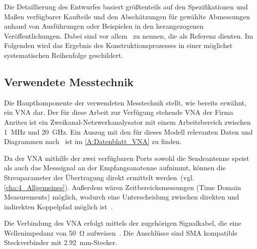
Die Detaillierung des Entwurfes basiert größtenteils auf den Spezifikationen und Maßen verfügbarer Kaufteile und den Abschätzungen für gewählte Abmessungen anhand von Ausführungen oder Beispielen in den herangezogenen Veröffentlichungen. Dabei sind vor allem~\cite{Design_of_shielded_enclosures, EMV-gerechtes_Geraetedesign, EM_Schirmung, Simplified_shielding, Handbook_Shielding_Materials_and_Performance} zu nennen, die als Referenz dienten. Im Folgenden wird das Ergebnis des Konstruktionsprozesses in einer möglichst systematischen Reihenfolge geschildert.

\subsection{Verwendete Messtechnik}

Die Hauptkomponente der verwendeten Messtechnik stellt, wie bereits erwähnt, ein \ac{VNA} dar. Der für diese Arbeit zur Verfügung stehende \ac{VNA} der Firma Anritsu ist ein Zweikanal-Netzwerkanalysator mit einem Arbeitsbereich zwischen \SI{1}{\mega\hertz} und \SI{20}{\giga\hertz}. Ein Auszug mit den für dieses Modell relevanten Daten und Diagrammen nach~\cite{VNA-Datenblatt} ist im \Anhang\ref{A:Datenblatt_VNA} zu finden. 
\par
\vspace{\linespace}
Da der \ac{VNA} mithilfe der zwei verfügbaren Ports sowohl die Sendeantenne speist als auch das Messsignal an der Empfangsanatenne aufnimmt, können die Streuparameter der Übertragung direkt ermittelt werden~(vgl. \Abschnitt\ref{cha:4_Allgemeines}). Außerdem wären Zeitbereichsmessungen (Time Domain Measurements) möglich, wodurch eine Unterscheidung zwischen direkten und indirekten Koppelpfad möglich ist~\cite{Techniques_Shielding_Effectiveness_Far_Field_Simulation}. %
\par
\vspace{\linespace}
Die Verbindung des \ac{VNA} erfolgt mittels der zugehörigen Signalkabel, die eine Wellenimpedanz von \SI{50}{\ohm} aufweisen~\cite{Testkabel_VNA-Datenblatt}. Die Anschlüsse sind \ac{SMA} kompatible Steckverbinder mit \SI{2,92}{\milli\meter}-Stecker.
